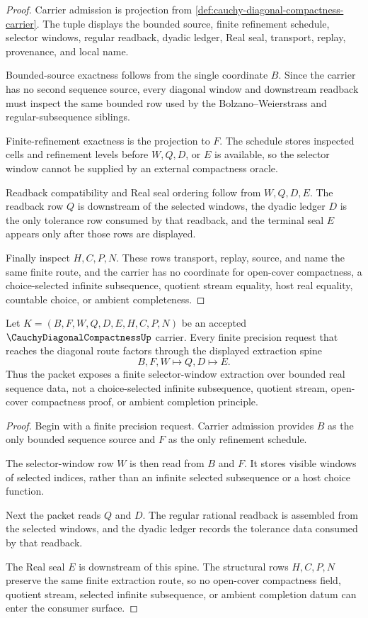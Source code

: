 \begin{proof}
Carrier admission is projection from \autoref{def:cauchy-diagonal-compactness-carrier}. The tuple displays the bounded source, finite refinement schedule, selector windows, regular readback, dyadic ledger, Real seal, transport, replay, provenance, and local name.

Bounded-source exactness follows from the single coordinate $B$. Since the carrier has no second sequence source, every diagonal window and downstream readback must inspect the same bounded row used by the Bolzano--Weierstrass and regular-subsequence siblings.

Finite-refinement exactness is the projection to $F$. The schedule stores inspected cells and refinement levels before $W,Q,D$, or $E$ is available, so the selector window cannot be supplied by an external compactness oracle.

Readback compatibility and Real seal ordering follow from $W,Q,D,E$. The readback row $Q$ is downstream of the selected windows, the dyadic ledger $D$ is the only tolerance row consumed by that readback, and the terminal seal $E$ appears only after those rows are displayed.

Finally inspect $H,C,P,N$. These rows transport, replay, source, and name the same finite route, and the carrier has no coordinate for open-cover compactness, a choice-selected infinite subsequence, quotient stream equality, host real equality, countable choice, or ambient completeness.
\end{proof}

\begin{theorem}
\label{thm:cauchy-diagonal-compactness-window-extraction}
Let $K=(B,F,W,Q,D,E,H,C,P,N)$ be an accepted $\CauchyDiagonalCompactnessUp$ carrier. Every finite precision request that reaches the diagonal route factors through the displayed extraction spine
$$
B,F,W \longmapsto Q,D \longmapsto E .
$$
Thus the packet exposes a finite selector-window extraction over bounded real sequence data, not a choice-selected infinite subsequence, quotient stream, open-cover compactness proof, or ambient completion principle.
\end{theorem}
\begin{proof}
Begin with a finite precision request. Carrier admission provides $B$ as the only bounded sequence source and $F$ as the only refinement schedule.

The selector-window row $W$ is then read from $B$ and $F$. It stores visible windows of selected indices, rather than an infinite selected subsequence or a host choice function.

Next the packet reads $Q$ and $D$. The regular rational readback is assembled from the selected windows, and the dyadic ledger records the tolerance data consumed by that readback.

The Real seal $E$ is downstream of this spine. The structural rows $H,C,P,N$ preserve the same finite extraction route, so no open-cover compactness field, quotient stream, selected infinite subsequence, or ambient completion datum can enter the consumer surface.
\end{proof}

